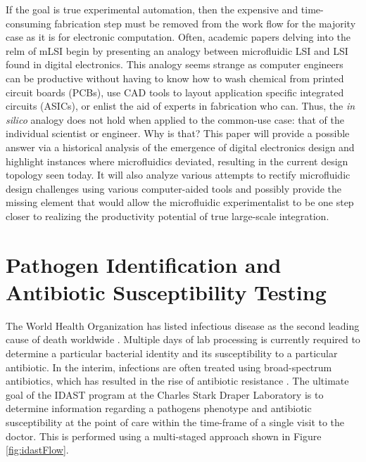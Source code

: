 If the goal is true experimental automation, then the expensive and time-consuming fabrication step must be removed from the work flow for the majority case as it is for electronic computation. Often, academic papers delving into the relm of mLSI begin by presenting an analogy between microfluidic LSI and LSI found in digital electronics. This analogy seems strange as computer engineers can be productive without having to know how to wash chemical from printed circuit boards (PCBs), use CAD tools to layout application specific integrated circuits (ASICs), or enlist the aid of experts in fabrication who can. Thus, the \emph{in silico} analogy does not hold when applied to the common-use case: that of the individual scientist or engineer. Why is that? This paper will provide a possible answer via a historical analysis of the emergence of digital electronics design and highlight instances where microfluidics deviated, resulting in the current design topology seen today. It will also analyze various attempts to rectify microfluidic design challenges using various computer-aided tools and possibly provide the missing element that would allow the microfluidic experimentalist to be one step closer to realizing the productivity potential of true large-scale integration. 



\section{Pathogen Identification and Antibiotic Susceptibility Testing}
\label{sec:cellSep}

The World Health Organization has listed infectious disease as the second leading cause of death worldwide \cite{world2004world}. Multiple days of lab processing is currently required to determine a particular bacterial identity and its susceptibility to a particular antibiotic. In the interim, infections are often treated using broad-spectrum antibiotics, which has resulted in the rise of antibiotic resistance \cite{laxminarayan2013antibiotic}. The ultimate goal of the IDAST program at the Charles Stark Draper Laboratory is to determine information regarding a pathogens phenotype and antibiotic susceptibility at the point of care within the time-frame of a single visit to the doctor. This is performed using a multi-staged approach shown in Figure \ref{fig:idastFlow}.


